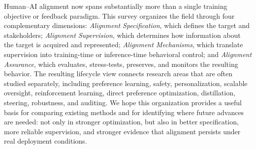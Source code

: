 \documentclass[11pt]{article}
\begin{document}
Human--AI alignment now spans substantially more than a single training objective or feedback paradigm. This survey organizes the field through four complementary dimensions: \emph{Alignment Specification}, which defines the target and stakeholders; \emph{Alignment Supervision}, which determines how information about the target is acquired and represented; \emph{Alignment Mechanisms}, which translate supervision into training-time or inference-time behavioral control; and \emph{Alignment Assurance}, which evaluates, stress-tests, preserves, and monitors the resulting behavior. The resulting lifecycle view connects research areas that are often studied separately, including preference learning, safety, personalization, scalable oversight, reinforcement learning, direct preference optimization, distillation, steering, robustness, and auditing. We hope this organization provides a useful basis for comparing existing methods and for identifying where future advances are needed: not only in stronger optimization, but also in better specification, more reliable supervision, and stronger evidence that alignment persists under real deployment conditions.




\end{document}
